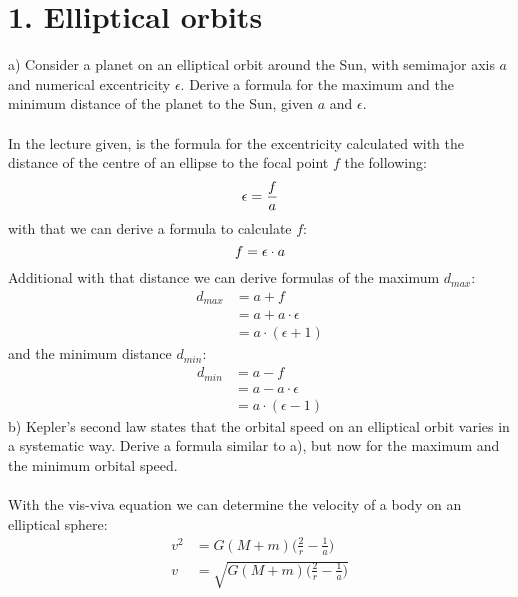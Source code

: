 \section*{1. Elliptical orbits}

a) Consider a planet on an elliptical orbit around the Sun, with semimajor axis $a$ and numerical 
excentricity $\epsilon$. Derive a formula for the maximum and the minimum distance of the planet to the
Sun, given $a$ and $\epsilon$.\\
\\
In the lecture given, is the formula for the excentricity calculated with the distance of the centre of an 
ellipse to the focal point $f$ the following:
\begin{equation*}
    \epsilon = \frac{f}{a}\\
\end{equation*}
with that we can derive a formula to calculate $f$:
\begin{equation*}
    f = \epsilon \cdot a\\
\end{equation*}
Additional with that distance we can derive formulas of the maximum $d_{max}$:
\begin{equation*}
    \begin{split}
        d_{max} &= a + f\\
                &= a + a \cdot \epsilon\\
                &= a \cdot (\epsilon + 1)
    \end{split}
\end{equation*}
and the minimum distance $d_{min}$:
\begin{equation*}
    \begin{split}
        d_{min} &= a - f\\
                &= a - a \cdot \epsilon\\
                &= a \cdot (\epsilon - 1)
    \end{split}
\end{equation*}
b) Kepler's second law states that the orbital speed on an elliptical orbit varies in a systematic way.
Derive a formula similar to a), but now for the maximum and the minimum orbital speed.\\
\\
With the vis-viva equation we can determine the velocity of a body on an elliptical sphere:
\begin{equation*}
    \begin{split}
        v^2 &= G (M + m) \biggl(\frac{2}{r} - \frac{1}{a}\biggr)\\
        v   &= \sqrt{G (M + m) \biggl(\frac{2}{r} - \frac{1}{a}\biggr)}\\
    \end{split}
\end{equation*}
